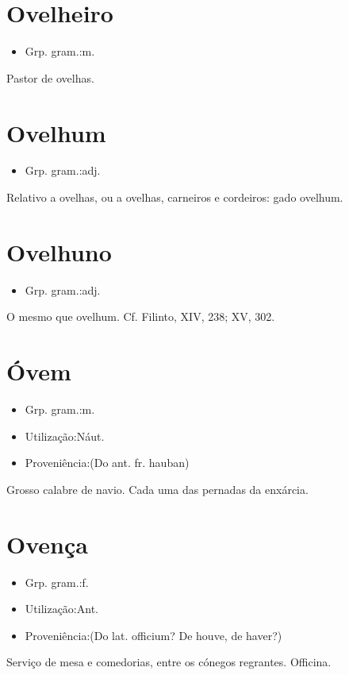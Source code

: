 \section{Ovelheiro}
\begin{itemize}
\item {Grp. gram.:m.}
\end{itemize}
Pastor de ovelhas.
\section{Ovelhum}
\begin{itemize}
\item {Grp. gram.:adj.}
\end{itemize}
Relativo a ovelhas, ou a ovelhas, carneiros e cordeiros: \textunderscore gado ovelhum\textunderscore .
\section{Ovelhuno}
\begin{itemize}
\item {Grp. gram.:adj.}
\end{itemize}
O mesmo que \textunderscore ovelhum\textunderscore . Cf. Filinto, XIV, 238; XV, 302.
\section{Óvem}
\begin{itemize}
\item {Grp. gram.:m.}
\end{itemize}
\begin{itemize}
\item {Utilização:Náut.}
\end{itemize}
\begin{itemize}
\item {Proveniência:(Do ant. fr. \textunderscore hauban\textunderscore )}
\end{itemize}
Grosso calabre de navio.
Cada uma das pernadas da enxárcia.
\section{Ovença}
\begin{itemize}
\item {Grp. gram.:f.}
\end{itemize}
\begin{itemize}
\item {Utilização:Ant.}
\end{itemize}
\begin{itemize}
\item {Proveniência:(Do lat. \textunderscore officium\textunderscore ? De \textunderscore houve\textunderscore , de \textunderscore haver\textunderscore ?)}
\end{itemize}
Serviço de mesa e comedorias, entre os cónegos regrantes.
Officina.
